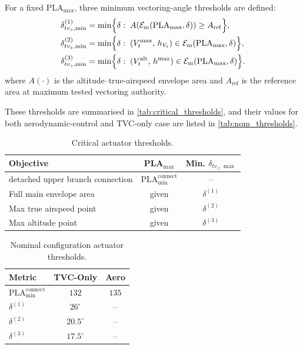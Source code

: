 \documentclass[conf]{new-aiaa}
\begin{document}
For a fixed $\mathrm{PLA}_{\max}$, three minimum vectoring-angle thresholds are defined:
\begin{align}
\delta_{tv_z,\min}^{(1)}
&=
\min \Bigl\{
\delta
:\;
A\!\left(\mathcal{E}_{\mathrm{m}}(\mathrm{PLA}_{\max},\delta)\right)
\ge A_{\mathrm{ref}}
\Bigr\},
\label{eq:crit1}
\\
\delta_{tv_z,\min}^{(2)}
&=
\min \Bigl\{
\delta
:\;
(V_t^{\max},\,h_{V_t})
\in
\mathcal{E}_{\mathrm{m}}(\mathrm{PLA}_{\max},\delta)
\Bigr\},
\label{eq:crit2}
\\
\delta_{tv_z,\min}^{(3)}
&=
\min \Bigl\{
\delta
:\;
(V_t^{\mathrm{alt}},\,h^{\max})
\in
\mathcal{E}_{\mathrm{m}}(\mathrm{PLA}_{\max},\delta)
\Bigr\}.
\label{eq:crit3}
\end{align}
where $A(\cdot)$ is the altitude--true-airspeed envelope area and $A_{\text{ref}}$ is the reference area at maximum tested vectoring authority.

These thresholds are summarised in \autoref{tab:critical_thresholds}, and their values for both aerodynamic-control and TVC-only case are listed in \autoref{tab:nom_thresholds}.

\begin{table}[h]
\centering
\footnotesize
\caption{Critical actuator thresholds.}
\label{tab:critical_thresholds}
\begin{tabular}{lcc}
\toprule
Objective & PLA$_{\max}$ & Min. $\delta_{tv_z,\max}$ \\
\midrule
detached upper branch connection & $\text{PLA}_{\min}^{\text{connect}}$ & -- \\
Full main envelope area & given & $\delta^{(1)}$ \\
Max true airspeed point & given & $\delta^{(2)}$ \\
Max altitude point & given & $\delta^{(3)}$ \\
\bottomrule
\end{tabular}
\end{table}

\begin{table}[h]
\centering
\footnotesize
\caption{Nominal configuration actuator thresholds.}
\label{tab:nom_thresholds}
\begin{tabular}{lcc}
\toprule
Metric & TVC-Only & Aero \\
\midrule
$\text{PLA}_{\min}^{\text{connect}}$ & $132$ & $135$\\
$\delta^{(1)}$ & $26^\circ$ & --\\
$\delta^{(2)}$ & $20.5^\circ$ & --\\
$\delta^{(3)}$ & $17.5^\circ$ & --\\
\bottomrule
\end{tabular}
\end{table}
\end{document}
